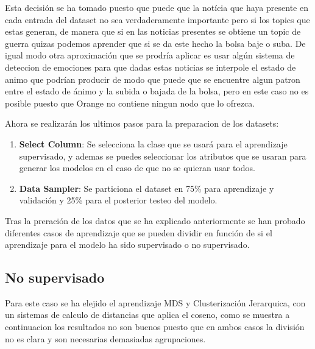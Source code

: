 \documentclass[runningheads]{llncs}
\begin{document}
Esta decisión se ha tomado puesto que puede que la notícia que haya presente en cada entrada del dataset no sea verdaderamente 
importante pero si los topics que estas generan, de manera que si en las noticias presentes se obtiene un topic de guerra quizas 
podemos aprender que si se da este hecho la bolsa baje o suba. De igual modo otra aproximación que se prodría aplicar es usar 
algún sistema de deteccion de emociones para que dadas estas noticias se interpole el estado de animo que podrían producir de 
modo que puede que se encuentre algun patron entre el estado de ánimo y la subida o bajada de la bolsa, pero en este caso no 
es posible puesto que Orange no contiene ningun nodo que lo ofrezca.


Ahora se realizarán los ultimos pasos para la preparacion de los datasets:

\begin{enumerate}
    \item \textbf{Select Column}: Se selecciona la clase que se usará para el aprendizaje supervisado, y ademas se puedes seleccionar
    los atributos que se usaran para generar los modelos en el caso de que no se quieran usar todos.
    \item \textbf{Data Sampler}: Se particiona el dataset en 75\% para aprendizaje y validación y 25\% para el posterior testeo del modelo.
\end{enumerate}

Tras la preración de los datos que se ha explicado anteriormente se han probado diferentes casos de aprendizaje que se pueden dividir en función de 
si el aprendizaje para el modelo ha sido supervisado o no supervisado.

\subsection{No supervisado}

Para este caso se ha elejido el aprendizaje MDS y Clusterización Jerarquica, con un sistemas de calculo de distancias que aplica el coseno,
como se muestra a continuacion los resultados no son buenos puesto que en ambos casos la división no es clara y son necesarias demasiadas agrupaciones.
\end{document}
